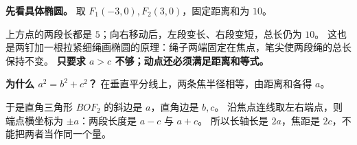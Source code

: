 \begin{explanationbox}
\textbf{先看具体椭圆。} 取 $F_1(-3,0),F_2(3,0)$，固定距离和为 $10$。

上方点的两段长都是 $5$；向右移动后，左段变长、右段变短，总长仍为 $10$。
这也是两钉加一根拉紧细绳画椭圆的原理：绳子两端固定在焦点，笔尖使两段绳的总长保持不变。
\textbf{只要求 $a>c$ 不够；动点还必须满足距离和等式。}
\end{explanationbox}
\clearpage
\begin{explanationbox}
\textbf{为什么 $a^2=b^2+c^2$？} 在垂直平分线上，两条焦半径相等，由距离和各得 $a$。

于是直角三角形 $BOF_2$ 的斜边是 $a$，直角边是 $b,c$。
沿焦点连线取左右端点，则端点横坐标为 $\pm a$：两段长度是 $a-c$ 与 $a+c$。
所以长轴长是 $2a$，焦距是 $2c$，不能把两者当作同一个量。
\end{explanationbox}
\clearpage
